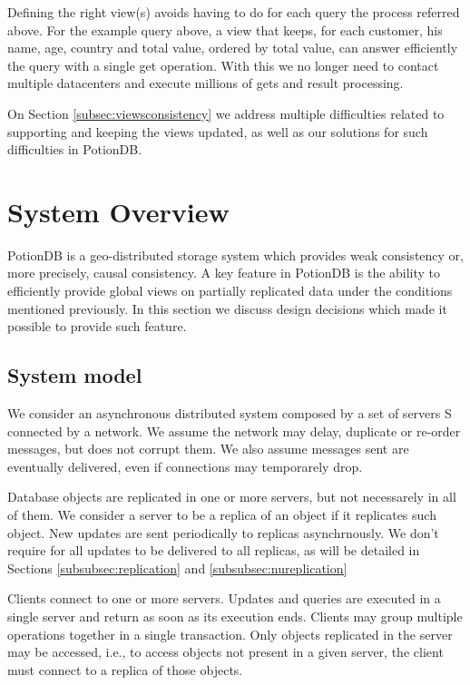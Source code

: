 \documentclass{vldb}
\begin{document}
Defining the right view(s) avoids having to do for each query the process referred above.
For the example query above, a view that keeps, for each customer, his name, age, country and total value, ordered by total value, can answer efficiently the query with a single get operation.
With this we no longer need to contact multiple datacenters and execute millions of gets and result processing.

On Section \ref{subsec:viewsconsistency} we address multiple difficulties related to supporting and keeping the views updated, as well as our solutions for such difficulties in PotionDB.

\section{System Overview}

PotionDB is a geo-distributed storage system which provides weak consistency or, more precisely, causal consistency.
A key feature in PotionDB is the ability to efficiently provide global views on partially replicated data under the conditions mentioned previously.
In this section we discuss design decisions which made it possible to provide such feature.

\subsection{System model}

We consider an asynchronous distributed system composed by a set of servers S connected by a network. 
We assume the network may delay, duplicate or re-order messages, but does not corrupt them. 
We also assume messages sent are eventually delivered, even if connections may temporarely drop.

Database objects are replicated in one or more servers, but not necessarely in all of them.  
We consider a server to be a replica of an object if it replicates such object. 
New updates are sent periodically to replicas asynchrnously. 
We don't require for all updates to be delivered to all replicas, as will be detailed in Sections \ref{subsubsec:replication} and \ref{subsubsec:nureplication}

Clients connect to one or more servers. 
Updates and queries are executed in a single server and return as soon as its execution ends.
Clients may group multiple operations together in a single transaction.
Only objects replicated in the server may be accessed, i.e., to access objects not present in a given server, the client must connect to a replica of those objects.
\end{document}
